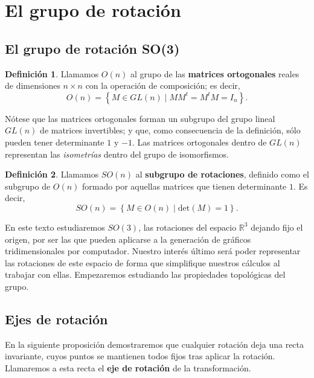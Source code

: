 \documentclass{article}
\theoremstyle{plain}
\theoremstyle{definition}
\newtheorem{definition}{Definición}
\theoremstyle{remark}
\begin{document}
\maketitle

\newpage
\tableofcontents
\newpage

\section{El grupo de rotación}
\subsection{El grupo de rotación SO(3)}

\begin{definition}
  Llamamos $O(n)$ al grupo de las \textbf{matrices ortogonales} reales
  de dimensiones $n \times n$ con la operación de composición; es
  decir,
  \[O(n) = \left\{ M \in GL(n) \mid MM^t=M^tM = I_n \right\}.\]
\end{definition}

Nótese que las matrices ortogonales forman un subgrupo del grupo
lineal $GL(n)$ de matrices invertibles; y que, como consecuencia de la definición, sólo
pueden tener determinante $1$ y $-1$. Las matrices ortogonales dentro
de $GL(n)$ representan las \textit{isometrías} dentro del grupo de isomorfismos.

\begin{definition}
  Llamamos $SO(n)$ al \textbf{subgrupo de rotaciones}, definido como
  el subgrupo de $O(n)$ formado por aquellas matrices que tienen
  determinante $1$. Es decir,
  \[SO(n) = \left\{ M \in O(n) \mid \mathrm{det}(M)=1 \right\}.\]
\end{definition}

En este texto estudiaremos $SO(3)$, las rotaciones del espacio
$\mathbb R^3$ dejando fijo el origen, por ser las que pueden aplicarse
a la generación de gráficos tridimensionales por computador. Nuestro
interés último será poder representar las rotaciones de este espacio
de forma que simplifique nuestros cálculos al trabajar con
ellas. Empezaremos estudiando las propiedades topológicas del grupo.

\subsection{Ejes de rotación}
En la siguiente proposición demostraremos que cualquier rotación deja
una recta invariante, cuyos puntos se mantienen todos fijos tras
aplicar la rotación. Llamaremos a esta recta el \textbf{eje de rotación}
de la transformación.
\end{document}
